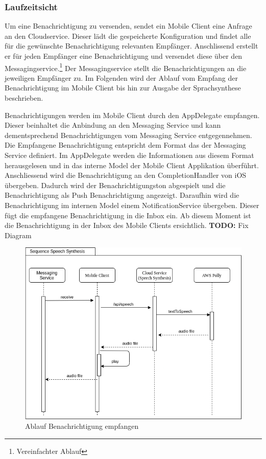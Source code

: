 \clearpage
\subsubsection{Laufzeitsicht}

Um eine Benachrichtigung zu versenden, sendet ein Mobile Client eine Anfrage an den Cloudservice.
Dieser lädt die gespeicherte Konfiguration und findet alle für die gewünschte Benachrichtigung relevanten Empfänger.
Anschlissend erstellt er für jeden Empfänger eine Benachrichtigung und versendet diese über den Messagingservice.\cite{ip5}\footnote{Vereinfachter Ablauf}
Der Messagingservice stellt die Benachrichtigungen an die jeweiligen Empfänger zu.
Im Folgenden wird der Ablauf vom Empfang der Benachrichtigung im Mobile Client bis hin zur Ausgabe der Sprachsynthese beschrieben.

Benachrichtigungen werden im Mobile Client durch den AppDelegate empfangen.
Dieser beinhaltet die Anbindung an den Messaging Service und kann dementsprechend Benachrichtigungen vom Messaging Service entgegennehmen.
Die Empfangene Benachrichtigung entspricht dem Format das der Messaging Service definiert.
Im AppDelegate werden die Informationen aus diesem Format herausgelesen und in das interne Model der Mobile Client Applikation überführt.
Anschliessend wird die Benachrichtigung an den CompletionHandler von iOS übergeben.
Dadurch wird der Benachrichtigungston abgespielt und die Benachrichtigung als Push Benachrichtigung angezeigt.
Daraufhin wird die Benachrichtigung im internen Model einem NotificationService übergeben.
Dieser fügt die empfangene Benachrichtigung in die Inbox ein.
Ab diesem Moment ist die Benachrichtigung in der Inbox des Mobile Clients ersichtlich.
\textbf{TODO: } Fix Diagram

\begin{figure}[h]
    \centering
    \begin{minipage}[b]{0.9\textwidth}
        \includegraphics[width=\textwidth]{graphics/diagramms/Sequence_Speech_Synth_V01}
        \caption{Ablauf Benachrichtigung empfangen}
    \end{minipage}
\end{figure}


